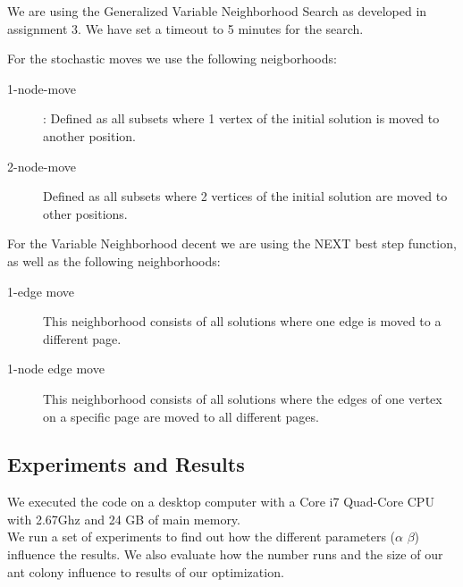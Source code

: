 \documentclass{scrartcl}
\begin{document}
We are using the Generalized Variable Neighborhood Search as developed in assignment 3.
We have set a timeout to 5 minutes for the search.

For the stochastic moves we use the following neigborhoods:

\begin{description}
\item[1-node-move]: Defined as all subsets where 1 vertex of the initial solution is moved to another position.
\item[2-node-move] 
Defined as all subsets where 2 vertices of the initial solution are moved to other positions.
\end{description}
 
For the Variable Neighborhood decent we are using the NEXT best step function, as well as the following 
neighborhoods:

\begin{description}
\item[1-edge move] This neighborhood consists of all solutions where one edge is moved to a different page. 
\item[1-node edge move] This neighborhood consists of all solutions where the edges of
	one vertex on a specific page are moved to all different pages. 
\end{description}



\subsection{Experiments and Results}
We executed the code on a desktop computer with a Core i7 Quad-Core
CPU with 2.67Ghz and 24 GB of main memory. \\

We run a set of experiments to find out how the different parameters
($\alpha$ $\beta$) influence the results. We also evaluate how the
number runs and the size of our ant colony influence to results of our
optimization. \\
\end{document}
